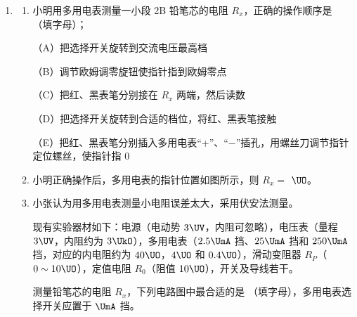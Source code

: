 \documentclass[\gkver]{gaokaozhenti}
\begin{document}
\begin{enumerate}
{\begin{enumerate}
\end{enumerate}
}

\item
\begin{enumerate}
	\item
	小明用多用电表测量一小段 2B 铅笔芯的电阻 $R_{x}$，正确的操作顺序是 （填字母）；

	（A）把选择开关旋转到交流电压最高档

	（B）调节欧姆调零旋钮使指针指到欧姆零点

	（C）把红、黑表笔分别接在 $R_{x}$ 两端，然后读数

	（D）把选择开关旋转到合适的档位，将红、黑表笔接触

	（E）把红、黑表笔分别插入多用电表“+”、“$-$”插孔，用螺丝刀调节指针定位螺丝，使指针指 0

	\item
	小明正确操作后，多用电表的指针位置如图所示，则 $R_{x}=$ $\UO$。

	\item
	小张认为用多用电表测量小电阻误差太大，采用伏安法测量。

	现有实验器材如下：电源（电动势 $3\UV$，内阻可忽略），电压表（量程 $3\UV$，内阻约为 $3\UkO$），多用电表（$2.5\UmA$ 挡、$25\UmA$ 挡和 $250\UmA$ 挡，对应的内电阻约为 $40\UO$，$4\UO$ 和 $0.4\UO$），滑动变阻器 $R_{P}$（$0\sim10\UO$），定值电阻 $R_{0}$（阻值 $10\UO$），开关及导线若干。

	测量铅笔芯的电阻 $R_{x}$，下列电路图中最合适的是 （填字母），多用电表选择开关应置于 $\UmA$ 挡。
\end{enumerate}
\end{enumerate}
\end{document}
